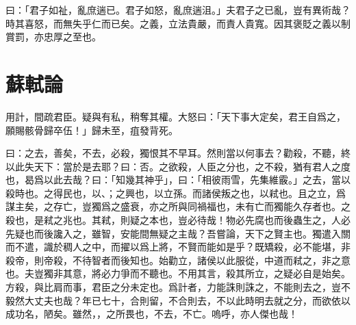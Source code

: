 曰：「君子如祉，亂庶遄已。君子如怒，亂庶遄沮。」夫君子之已亂，豈有異術哉？時其喜怒，而無失乎仁而已矣。之義，立法貴嚴，而責人貴寬。因其褒貶之義以制賞罰，亦忠厚之至也。

\section[范增論\quad{\small 蘇軾}]{{\normalsize 蘇軾}\quad{}論}
用計，間疏君臣。疑與有私，稍奪其權。大怒曰：「天下事大定矣，君王自爲之，願賜骸骨歸卒伍！」歸未至，疽發背死。

曰：之去，善矣，不去，必殺，獨恨其不{早}耳。然則當以何事去？勸殺，不聽，終以此失天下：當於是去耶？曰：否。之欲殺，人臣之分也，之不殺，猶有君人之度也，曷爲以此去哉？曰：「知幾其神乎」，曰：「相彼雨雪，先集維霰。」之去，當以殺時也。之得民也，以、；之興也，以立孫。而諸侯叛之也，以弒也。且之立，爲謀主矣，之存亡，豈獨爲之盛衰，亦之所與同禍福也，未有亡而獨能久存者也。之殺也，是弒之兆也。其弒，則疑之本也，豈必待哉！物必先腐也而後蟲生之，人必先疑也而後讒入之，雖智，安能間無疑之主哉？吾嘗論，天下之賢主也。獨遣入關而不遣，識於稠人之中，而擢以爲上將，不賢而能如是乎？既矯殺，必不能堪，非殺帝，則帝殺，不待智者而後知也。始勸立，諸侯以此服從，中道而弒之，非之意也。夫豈獨非其意，將必力爭而不聽也。不用其言，殺其所立，之疑必自是始矣。方殺，與比肩而事，君臣之分未定也。爲計者，力能誅則誅之，不能則去之，豈不毅然大丈夫也哉？年已七十，合則留，不合則去，不以此時明去就之分，而欲依以成功名，陋矣。雖然，，之所畏也，不去，不亡。嗚呼，亦人傑也哉！


